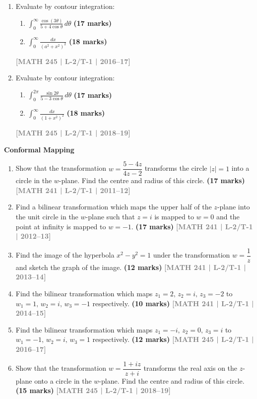 \documentclass[12pt,a4paper]{article}
\newcommand{\yr}[1]{\hfill\textcolor{gray}{\small\textbf{[#1]}}}
\newcommand{\mk}[1]{\textcolor{orange!70!black}{\small\textbf{(#1 marks)}}}
\newcommand{\subtopic}[2]{%
  \vspace{10pt}
  \noindent\begin{tcolorbox}[colback=#1!8,colframe=#1,boxrule=0.6pt,arc=4pt,
    left=6pt,right=6pt,top=4pt,bottom=4pt]
    \small\bfseries\textcolor{#1}{#2}
  \end{tcolorbox}
  \vspace{2pt}
}
\begin{document}
\begin{enumerate}
\item Evaluate by contour integration:
\begin{enumerate}
  \item $\displaystyle\int_{0}^{\infty}\frac{\cos(3\theta)}{5+4\cos\theta}\,d\theta$ \mk{17}
  \item $\displaystyle\int_{0}^{\infty}\frac{dx}{(a^{2}+x^{2})^{2}}$ \mk{18}
\end{enumerate}
\yr{MATH 245 | L-2/T-1 | 2016--17}

\item Evaluate by contour integration:
\begin{enumerate}
  \item $\displaystyle\int_{0}^{2\pi}\frac{\sin 2\theta}{5-3\cos\theta}\,d\theta$ \mk{17}
  \item $\displaystyle\int_{0}^{\infty}\frac{dx}{(1+x^{2})^{2}}$ \mk{18}
\end{enumerate}
\yr{MATH 245 | L-2/T-1 | 2018--19}

\end{enumerate}

\subtopic{cE}{Conformal Mapping}
\label{sub:s5-conformal}

\begin{enumerate}

\item Show that the transformation $w=\dfrac{5-4z}{4z-2}$ transforms the circle $|z|=1$ into a circle in the $w$-plane. Find the centre and radius of this circle.
\mk{17} \yr{MATH 241 | L-2/T-1 | 2011--12}

\item Find a bilinear transformation which maps the upper half of the $z$-plane into the unit circle in the $w$-plane such that $z=i$ is mapped to $w=0$ and the point at infinity is mapped to $w=-1$.
\mk{17} \yr{MATH 241 | L-2/T-1 | 2012--13}

\item Find the image of the hyperbola $x^{2}-y^{2}=1$ under the transformation $w=\dfrac{1}{z}$ and sketch the graph of the image.
\mk{12} \yr{MATH 241 | L-2/T-1 | 2013--14}

\item Find the bilinear transformation which maps $z_{1}=2,\,z_{2}=i,\,z_{3}=-2$ to $w_{1}=1,\,w_{2}=i,\,w_{3}=-1$ respectively.
\mk{10} \yr{MATH 241 | L-2/T-1 | 2014--15}

\item Find the bilinear transformation which maps $z_{1}=-i,\,z_{2}=0,\,z_{3}=i$ to $w_{1}=-1,\,w_{2}=i,\,w_{3}=1$ respectively.
\mk{12} \yr{MATH 245 | L-2/T-1 | 2016--17}

\item Show that the transformation $w=\dfrac{1+iz}{z+i}$ transforms the real axis on the $z$-plane onto a circle in the $w$-plane. Find the centre and radius of this circle.
\mk{15} \yr{MATH 245 | L-2/T-1 | 2018--19}

\end{enumerate}
\end{document}

